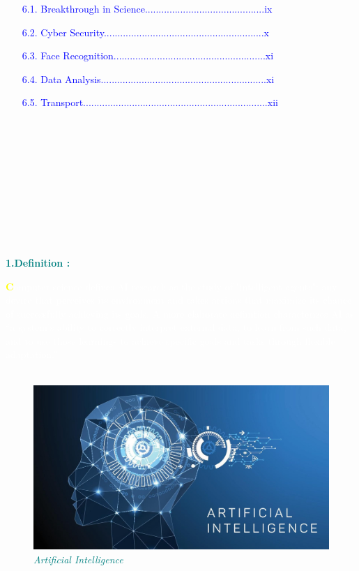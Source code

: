 \documentclass[12pt]{article}
\begin{document}
\begin{itemize}
\begin{enumerate}
   \item[\textcolor{blue}{6.1.}]\textcolor{blue}{Breakthrough in Science............................................ix}
   \item[\textcolor{blue}{6.2.}]\textcolor{blue}{Cyber Security...........................................................x}
   \item[\textcolor{blue}{6.3.}]\textcolor{blue}{Face Recognition........................................................xi}
   \item[\textcolor{blue}{6.4.}]\textcolor{blue}{Data Analysis.............................................................xi}
   \item[\textcolor{blue}{6.5.}]\textcolor{blue}{Transport....................................................................xii}\\\\\\\\\\\\\\\\\\\\\\
\end{enumerate}
\end{itemize}

                              

\begin{large}
\textbf{\textcolor{teal}{1.Definition :}}\\
\end{large}

\textcolor{white}{\textbf{\textcolor{yellow}{\huge C}}omputer science defines AI research as the study of "intelligent agents": any device that perceives its environment and takes actions that maximize its chance of successfully achieving its goals. A more elaborate definition characterizes AI as “a system’s ability to correctly interpret external data, to learn from such data, and to use those learnings to achieve specific goals and tasks through flexible adaptation.”}\\\\

\begin{figure}[h]
\centering
\includegraphics[scale=0.19]{1-thCB4VzqsRapqFCHC8w7EQ}
\caption{\textit{\textcolor{teal}{Artificial Intelligence}}}
\end{figure}
\end{document}
